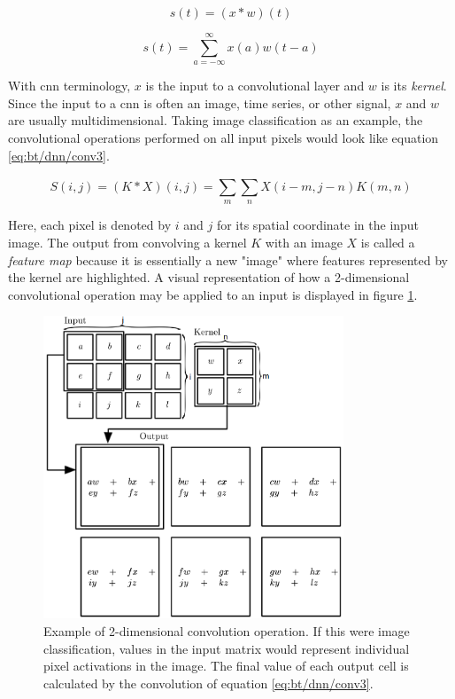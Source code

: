 \begin{equation}
    \label{eq:bt/dnn/conv1}
    s(t)=(x*w)(t)
\end{equation}

\begin{equation}
    \label{eq:bt/dnn/conv2}
    s(t)=\sum_{a=-\infty}^{\infty}x(a)w(t-a)
\end{equation}

With \acrshort{cnn} terminology, $x$ is the input to a convolutional layer and $w$ is its \textit{kernel}. Since the input to a \acrshort{cnn} is often an image, time series, or other signal, $x$ and $w$ are usually multidimensional. Taking image classification as an example, the convolutional operations performed on all input pixels would look like equation \ref{eq:bt/dnn/conv3}.

\begin{equation}
    \label{eq:bt/dnn/conv3}
    S(i,j)=(K*X)(i,j)=\sum_{m}^{}\sum_{n}^{}X(i-m,j-n)K(m,n)
\end{equation}

Here, each pixel is denoted by $i$ and $j$ for its spatial coordinate in the input image. The output from convolving a kernel $K$ with an image $X$ is called a \textit{feature map} because it is essentially a new "image" where features represented by the kernel are highlighted. A visual representation of how a 2-dimensional convolutional operation may be applied to an input is displayed in figure \ref{fig:bt_conv}.

\begin{figure}[h]
    \centering
    \includegraphics[width=0.8\textwidth]{figures/bt_conv.png}
    \caption{Example of 2-dimensional convolution operation. If this were image classification, values in the input matrix would represent individual pixel activations in the image. The final value of each output cell is calculated by the convolution of equation \ref{eq:bt/dnn/conv3}.}
    \label{fig:bt_conv}
\end{figure}

